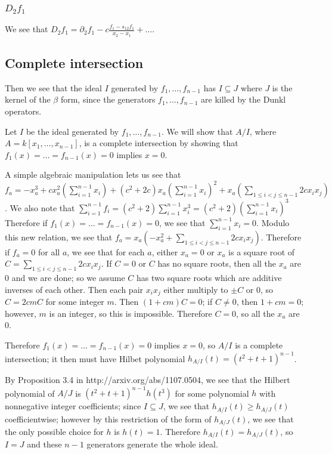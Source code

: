 \documentclass{article}
\numberwithin{equation}{section}
\begin{document}
\subsubsection{$D_2f_1$}

We see that $D_2f_1 = \partial_2f_1-c\frac{f_1-s_{12}f_1}{x_2-x_1} + \dots$. %





\subsection{Complete intersection}

Then we see that the ideal $I$ generated by $f_1,\dots,f_{n-1}$ has $I \subseteq J$ where $J$ is the kernel of the $\beta$ form, since the generators $f_1,\dots,f_{n-1}$ are killed by the Dunkl operators. 

Let $I$ be the ideal generated by $f_1,\dots, f_{n-1}$. We will show that $A/I$, where $A=k[x_1,\dots,x_{n-1}]$, is a complete intersection by showing that $f_1(x) = \dots = f_{n-1}(x)=0$ implies $x=0$. 

A simple algebraic manipulation lets us see that $f_a=-x_a^3+c x_a^2\left(\sum_{i=1}^{n-1} x_i \right)+(c^2+2c)x_a\left(\sum_{i=1}^{n-1} x_i\right)^2+x_a\left(\sum_{1 \le i < j  \le n-1} 2cx_ix_j\right)$. %
We also note that $\sum_{i=1}^{n-1} f_i = (c^2+2)\sum_{i=1}^{n-1} x_i^3 = (c^2+2)\left(\sum_{i=1}^{n-1} x_i \right)^3$ %
Therefore if $f_1(x) = \dots = f_{n-1}(x)=0$, we see that $\sum_{i=1}^{n-1} x_i = 0$. %
Modulo this new relation, we see that $f_a=x_a\left(-x_a^2+\sum_{1 \le i < j  \le n-1} 2cx_ix_j\right)$. Therefore if $f_a=0$ for all $a$, we see that for each $a$, either $x_a=0$ or $x_a$ is a square root of $C=\sum_{1 \le i < j  \le n-1} 2cx_ix_j$. If $C=0$ or $C$ has no square roots, then all the $x_a$ are 0 and we are done; so we assume $C$ has two square roots which are additive inverses of each other. Then each pair $x_ix_j$ either multiply to $\pm C$ or $0$, so $C=2cmC$ for some integer $m$. Then $(1+cm)C=0$; if $C \ne 0$, then $1+cm=0$; however, $m$ is an integer, so this is impossible. Therefore $C=0$, so all the $x_a$ are $0$.

Therefore $f_1(x) = \dots = f_{n-1}(x)=0$ implies $x=0$, so $A/I$ is a complete intersection; it then must have Hilbet polynomial $h_{A/I}(t)=(t^2+t+1)^{n-1}$. 

By Proposition 3.4 in http://arxiv.org/abs/1107.0504, we see that the Hilbert polynomial of $A/J$ is $(t^2+t+1)^{n-1}h(t^3)$ for some polynomial $h$ with nonnegative integer coefficients; since $I \subseteq J$, we see that $h_{A/I}(t) \ge h_{A/J}(t)$ coefficientwise; however by this restriction of the form of $h_{A/J}(t)$, we see that the only possible choice for $h$ is $h(t)=1$. Therefore $h_{A/I}(t)=h_{A/J}(t)$, so $I=J$ and these $n-1$ generators generate the whole ideal.
\end{document}

